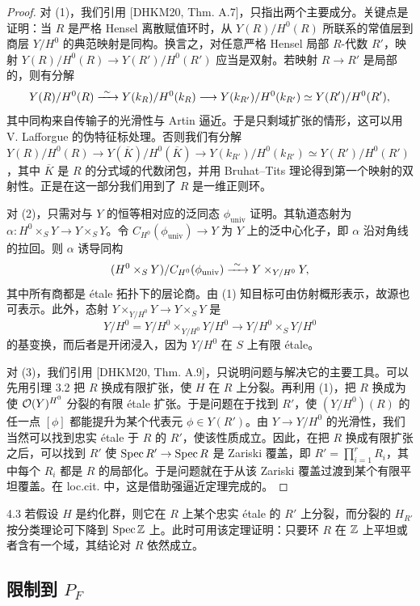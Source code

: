 \begin{proof}
对 (1)，我们引用 [DHKM20, Thm. A.7]，只指出两个主要成分。关键点是证明：当 $R$ 是严格 Hensel 离散赋值环时，从 $Y(R)/H^0(R)$ 所联系的常值层到商层 $Y/H^0$ 的典范映射是同构。换言之，对任意严格 Hensel 局部 $R$-代数 $R'$，映射 $Y(R)/H^0(R)\to Y(R')/H^0(R')$ 应当是双射。若映射 $R\to R'$ 是局部的，则有分解
\[
Y(R)/H^0(R)\xrightarrow{\ \sim\ } Y(k_R)/H^0(k_R)\longrightarrow Y(k_{R'})/H^0(k_{R'})\simeq Y(R')/H^0(R'),
\]
其中同构来自传输子的光滑性与 Artin 逼近。于是只剩域扩张的情形，这可以用 V. Lafforgue 的伪特征标处理。否则我们有分解 $Y(R)/H^0(R)\to Y(\overline K)/H^0(\overline K)\to Y(k_{R'})/H^0(k_{R'})\simeq Y(R')/H^0(R')$，其中 $\overline K$ 是 $R$ 的分式域的代数闭包，并用 Bruhat–Tits 理论得到第一个映射的双射性。正是在这一部分我们用到了 $R$ 是一维正则环。

对 (2)，只需对与 $Y$ 的恒等相对应的泛同态 $\phi_{\mathrm{univ}}$ 证明。其轨道态射为 $\alpha:H^0\times_S Y\to Y\times_S Y$。令 $C_{H^0}(\phi_{\mathrm{univ}})\to Y$ 为 $Y$ 上的泛中心化子，即 $\alpha$ 沿对角线的拉回。则 $\alpha$ 诱导同构
\[
(H^0\times_S Y)/C_{H^0}(\phi_{\mathrm{univ}})\xrightarrow{\ \sim\ } Y\times_{Y/H^0}Y,
\]
其中所有商都是 étale 拓扑下的层论商。由 (1) 知目标可由仿射概形表示，故源也可表示。此外，态射 $Y\times_{Y/H^0}Y\to Y\times_S Y$ 是
\[
Y/H^0=Y/H^0\times_{Y/H^0}Y/H^0\longrightarrow Y/H^0\times_S Y/H^0
\]
的基变换，而后者是开闭浸入，因为 $Y/H^0$ 在 $S$ 上有限 étale。

对 (3)，我们引用 [DHKM20, Thm. A.9]，只说明问题与解决它的主要工具。可以先用引理 3.2
把 $R$ 换成有限扩张，使 $H$ 在 $R$ 上分裂。再利用 (1)，把 $R$ 换成为使 $\mathcal{O}(Y)^{H^0}$ 分裂的有限 étale 扩张。于是问题在于找到 $R'$，使 $(Y/H^0)(R)$ 的任一点 $[\phi]$ 都能提升为某个代表元 $\phi\in Y(R')$。由 $Y\to Y/H^0$ 的光滑性，我们当然可以找到忠实 étale 于 $R$ 的 $R'$，使该性质成立。因此，在把 $R$ 换成有限扩张之后，可以找到 $R'$ 使 $\operatorname{Spec} R'\to\operatorname{Spec} R$ 是 Zariski 覆盖，即 $R'=\prod_{i=1}^rR_i$，其中每个 $R_i$ 都是 $R$ 的局部化。于是问题就在于从该 Zariski 覆盖过渡到某个有限平坦覆盖。在 loc.cit. 中，这是借助强逼近定理完成的。
\end{proof}

\begin{rem}{4.3}
若假设 $H$ 是约化群，则它在 $R$ 上某个忠实 étale 的 $R'$ 上分裂，而分裂的 $H_{R'}$ 按分类理论可下降到 $\operatorname{Spec}\mathbb{Z}$ 上。此时可用该定理证明：只要环 $R$ 在 $\mathbb{Z}$ 上平坦或者含有一个域，其结论对 $R$ 依然成立。
\end{rem}

\subsection{限制到 $P_F$}


